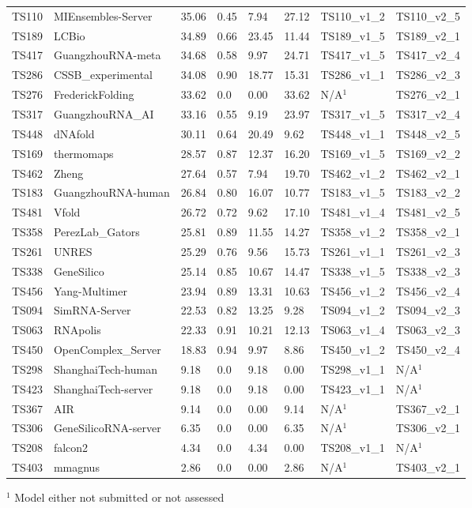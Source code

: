 \begin{table}[ht]
{\begin{tabular}{llllllll}
TS110 & MIEnsembles-Server & 35.06 & 0.45 & 7.94 & 27.12 & TS110\_v1\_2 & TS110\_v2\_5 \\ 
TS189 & LCBio & 34.89 & 0.66 & 23.45 & 11.44 & TS189\_v1\_5 & TS189\_v2\_1 \\ 
TS417 & GuangzhouRNA-meta & 34.68 & 0.58 & 9.97 & 24.71 & TS417\_v1\_5 & TS417\_v2\_4 \\ 
TS286 & CSSB\_experimental & 34.08 & 0.90 & 18.77 & 15.31 & TS286\_v1\_1 & TS286\_v2\_3 \\ 
TS276 & FrederickFolding & 33.62 & 0.0 & 0.00 & 33.62 & N/A$^{1}$ & TS276\_v2\_1 \\ 
TS317 & GuangzhouRNA\_AI & 33.16 & 0.55 & 9.19 & 23.97 & TS317\_v1\_5 & TS317\_v2\_4 \\ 
TS448 & dNAfold & 30.11 & 0.64 & 20.49 & 9.62 & TS448\_v1\_1 & TS448\_v2\_5 \\ 
TS169 & thermomaps & 28.57 & 0.87 & 12.37 & 16.20 & TS169\_v1\_5 & TS169\_v2\_2 \\ 
TS462 & Zheng & 27.64 & 0.57 & 7.94 & 19.70 & TS462\_v1\_2 & TS462\_v2\_1 \\ 
TS183 & GuangzhouRNA-human & 26.84 & 0.80 & 16.07 & 10.77 & TS183\_v1\_5 & TS183\_v2\_2 \\ 
TS481 & Vfold & 26.72 & 0.72 & 9.62 & 17.10 & TS481\_v1\_4 & TS481\_v2\_5 \\ 
TS358 & PerezLab\_Gators & 25.81 & 0.89 & 11.55 & 14.27 & TS358\_v1\_2 & TS358\_v2\_1 \\ 
TS261 & UNRES & 25.29 & 0.76 & 9.56 & 15.73 & TS261\_v1\_1 & TS261\_v2\_3 \\ 
TS338 & GeneSilico & 25.14 & 0.85 & 10.67 & 14.47 & TS338\_v1\_5 & TS338\_v2\_3 \\ 
TS456 & Yang-Multimer & 23.94 & 0.89 & 13.31 & 10.63 & TS456\_v1\_2 & TS456\_v2\_4 \\ 
TS094 & SimRNA-Server & 22.53 & 0.82 & 13.25 & 9.28 & TS094\_v1\_2 & TS094\_v2\_3 \\ 
TS063 & RNApolis & 22.33 & 0.91 & 10.21 & 12.13 & TS063\_v1\_4 & TS063\_v2\_3 \\ 
TS450 & OpenComplex\_Server & 18.83 & 0.94 & 9.97 & 8.86 & TS450\_v1\_2 & TS450\_v2\_4 \\ 
TS298 & ShanghaiTech-human & 9.18 & 0.0 & 9.18 & 0.00 & TS298\_v1\_1 & N/A$^{1}$ \\ 
TS423 & ShanghaiTech-server & 9.18 & 0.0 & 9.18 & 0.00 & TS423\_v1\_1 & N/A$^{1}$ \\ 
TS367 & AIR & 9.14 & 0.0 & 0.00 & 9.14 & N/A$^{1}$ & TS367\_v2\_1 \\ 
TS306 & GeneSilicoRNA-server & 6.35 & 0.0 & 0.00 & 6.35 & N/A$^{1}$ & TS306\_v2\_1 \\ 
TS208 & falcon2 & 4.34 & 0.0 & 4.34 & 0.00 & TS208\_v1\_1 & N/A$^{1}$ \\ 
TS403 & mmagnus & 2.86 & 0.0 & 0.00 & 2.86 & N/A$^{1}$ & TS403\_v2\_1 \\ 
\bottomrule
\end{tabular}%
}
\begin{flushleft}\footnotesize $^{1}$ Model either not submitted or not assessed\end{flushleft}
\end{table}
